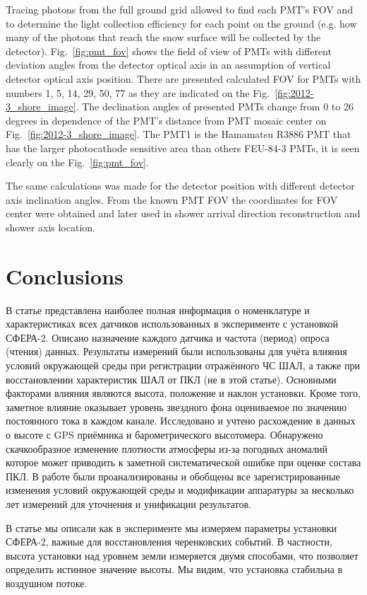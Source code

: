 \documentclass[final,5p,times,twocolumn]{elsarticle}
\begin{document}
Tracing photons from the full ground grid allowed to find each PMT's FOV and to determine the light collection efficiency for each point on the ground (e.g. how many of the photons that reach the snow surface will be collected by the detector).
Fig.~\ref{fig:pmt_fov} shows the field of view of PMTs with different deviation angles  from the detector optical axis in an assumption of vertical detector optical axis position. There are presented calculated FOV for PMTs with numbers 1, 5, 14, 29, 50, 77 as they are indicated on the Fig.~\ref{fig:2012-3_shore_image}. The declination angles of presented PMTs change from 0 to 26 degrees in dependence of the PMT's distance from PMT mosaic center on Fig.~\ref{fig:2012-3_shore_image}. The PMT1 is the Hamamatsu R3886 PMT that has the larger photocathode sensitive area than others FEU-84-3 PMTs, it is seen clearly on the Fig.~\ref{fig:pmt_fov}. 

The same calculations was made for the detector position with different detector axis inclination angles. From the known PMT FOV the coordinates for FOV center were obtained and later used in shower arrival direction reconstruction and shower axis location.

\section{Conclusions \label{sect:conclusions}}
{\Russian
В статье представлена наиболее полная информация о номенклатуре и характеристиках всех датчиков  использованных в эксперименте с установкой СФЕРА-2. Описано назначение каждого датчика и частота (период) опроса (чтения) данных. Результаты измерений были использованы для учёта влияния условий окружающей среды при регистрации отражённого ЧС ШАЛ, а также при восстановлении характеристик ШАЛ от ПКЛ (не в этой статье).
Основными факторами влияния являются высота, положение и наклон установки. Кроме того, заметное влияние оказывает уровень звездного фона оцениваемое по значению постоянного тока в каждом канале. Исследовано и учтено расхождение в данных о высоте с GPS приёмника и барометрического высотомера. Обнаружено скачкообразное изменение плотности атмосферы из-за погодных аномалий которое может приводить к заметной систематической ошибке при оценке состава ПКЛ. В работе были проанализированы и обобщены все зарегистрированные изменения условий окружающей среды и модификации аппаратуры за несколько лет измерений для уточнения и унификации результатов.

В статье мы описали как в эксперименте мы измеряем параметры установки  СФЕРА-2, важные для восстановления черенковских событий.  В частности, высота установки над уровнем земли измеряется двумя способами, что позволяет определить истинное значение высоты. Мы видим, что установка стабильна в воздушном потоке.
}
\end{document}
